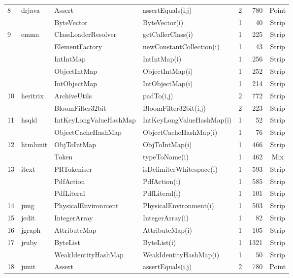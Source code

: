 \documentclass[runningheads,a4paper]{llncs}
\begin{document}
\begin{table}[H]
{{\begin{tabular}{|l|l|l|l|r|r|c|}
8	&	drjava		& Assert					& assertEquals(i,j)		& 2			& 780	& Point										\\ 
	&				& ByteVector				& ByteVector(i)			& 1			& 40	& Strip  										\\ 			
9	&	emma		& ClassLoaderResolver	& getCallerClass(i)		& 1			& 225	& Strip										\\ 
	&				& ElementFactory			& newConstantCollection(i)& 1			& 43	& Strip  										 \\ 
	&				& IntIntMap				& IntIntMap(i)			& 1			& 256	& Strip										\\ 
	&				& ObjectIntMap			& ObjectIntMap(i)			& 1			& 252	& Strip 										\\ 
	&				& IntObjectMap			& IntObjectMap(i)			& 1			& 214	& Strip 										\\ 
10	&	heritrix		& ArchiveUtils			& padTo(i,j)				& 2			& 772	& Strip  										\\ 
	&				& BloomFilter32bit 		& BloomFilter32bit(i,j)		& 2	 		& 223	& Strip  										\\ 
11	&	hsqld		& IntKeyLongValueHashMap& IntKeyLongValueHashMap(i)& 1		& 52	& Strip 										\\ 
	&				& ObjectCacheHashMap	& ObjectCacheHashMap(i)	& 1			& 76	& Strip   										\\ 
12	&	htmlunit		& ObjToIntMap			& ObjToIntMap(i)			& 1			& 466	& Strip  										\\ 
	&				& Token					& typeToName(i)			& 1			& 462	& Mix 										\\ 
13	&	itext		& PRTokeniser			& isDelimiterWhitespace(i)	& 1			& 593	& Strip  										\\ 
	&				& PdfAction				& PdfAction(i)			& 1			& 585	& Strip  										\\ 
	&				& PdfLiteral				& PdfLiteral(i)			& 1			& 101	& Strip 										\\ 
14	&	jung		& PhysicalEnvironment	& PhysicalEnvironment(i)	& 1			& 503	& Strip 										\\ 
15	&	jedit		& IntegerArray			& IntegerArray(i)			& 1			& 82	& Strip  										\\ 
16	&	jgraph		& AttributeMap			& AttributeMap(i)			& 1			& 105	& Strip										\\ 
17	&	jruby		& ByteList				& ByteList(i)				& 1			& 1321	& Strip 										\\ 
	&				& WeakIdentityHashMap	& WeakIdentityHashMap(i)	& 1			& 50	& Strip 										\\ 
18	&	junit		& Assert					& assertEquals(i,j)		& 2			& 780	& Point 										\\ 

\end{tabular}}}
\end{table}
\end{document}
